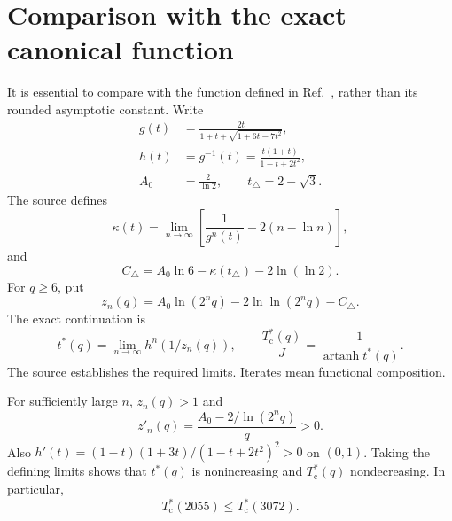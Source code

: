 \documentclass[aps,pre,reprint,amsmath,amssymb,nofootinbib,longbibliography,floatfix]{revtex4-2}
\newcommand{\Tc}{T_{\mathrm c}}
\newcommand{\atanh}{\operatorname{artanh}}
\begin{document}
\section{Comparison with the exact canonical function}
It is essential to compare with the function defined in Ref.~\cite{JosephWalshBoettcher2026}, rather than its rounded asymptotic constant. Write
\begin{equation}
\begin{aligned}
 g(t)&=\frac{2t}{1+t+\sqrt{1+6t-7t^2}},\\
 h(t)&=g^{-1}(t)=\frac{t(1+t)}{1-t+2t^2},\\
 A_0&=\frac2{\ln2},\qquad t_\triangle=2-\sqrt3.
\end{aligned}
\end{equation}
The source defines
\begin{equation}
 \kappa(t)=\lim_{n\to\infty}
       \left[\frac1{g^n(t)}-2(n-\ln n)\right],
\end{equation}
and
\begin{equation}
 C_\triangle=A_0\ln6-\kappa(t_\triangle)-2\ln(\ln2).
\end{equation}
For \(q\geq6\), put
\begin{equation}
 z_n(q)=A_0\ln(2^nq)-2\ln\!\ln(2^nq)-C_\triangle.
\end{equation}
The exact continuation is
\begin{equation}
 t^*(q)=\lim_{n\to\infty}h^n(1/z_n(q)),\qquad
 \frac{\Tc^*(q)}J=\frac1{\atanh t^*(q)}.
 \label{eq:canonicaldefinition}
\end{equation}
The source establishes the required limits. Iterates mean functional composition.

For sufficiently large \(n\), \(z_n(q)>1\) and
\begin{equation}
 z'_n(q)=\frac{A_0-2/\ln(2^nq)}q>0.
\end{equation}
Also \(h'(t)=(1-t)(1+3t)/(1-t+2t^2)^2>0\) on \((0,1)\). Taking the defining limits shows that \(t^*(q)\) is nonincreasing and \(\Tc^*(q)\) nondecreasing. In particular,
\begin{equation}
 \Tc^*(2055)\leq\Tc^*(3072).
 \label{eq:monotonecomparison}
\end{equation}
\end{document}
